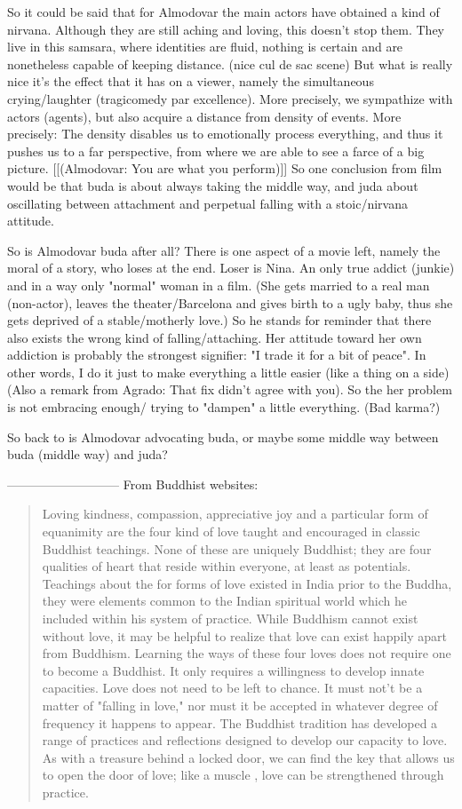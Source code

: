 \documentclass[10pt]{book}
\begin{document}
So it could be said that for Almodovar the main actors have obtained a kind of nirvana. Although they are still aching and loving, this doesn't stop them. They live in this samsara, where identities are fluid, nothing is certain and are nonetheless capable of keeping distance. (nice cul de sac scene) But what is really nice it's the effect that it has on a viewer, namely the simultaneous crying/laughter (tragicomedy par excellence). More precisely, we sympathize with actors (agents), but also acquire a distance from density of events. More precisely: The density disables us to emotionally process everything, and thus it pushes us to a far perspective, from where we are able to see a farce of a big picture.
[[(Almodovar: You are what you perform)]]
So one conclusion from film would be that buda is about always taking the middle way, and juda about oscillating between attachment and perpetual falling with a stoic/nirvana attitude.

So is Almodovar buda after all? There is one aspect of a movie left, namely the moral of a story, who loses at the end. Loser is Nina. An only true addict (junkie) and in a way only "normal" woman in a film. (She gets married to a real man (non-actor), leaves the theater/Barcelona and gives birth to a ugly baby, thus she gets deprived of a stable/motherly love.) So he stands for reminder that there also exists the wrong kind of falling/attaching. Her attitude toward her own addiction is probably the strongest signifier: "I trade it for a bit of peace". In other words, I do it just to make everything a little easier (like a thing on a side) (Also a remark from Agrado: That fix didn't agree with you). So the her problem is not embracing enough/ trying to "dampen" a little everything. (Bad karma?)

So back to is Almodovar advocating buda, or maybe some middle way between buda (middle way) and juda?  

---------------------------
From Buddhist websites:
\begin{quotation}
Loving kindness, compassion, appreciative joy and a particular form of equanimity are the four kind of love taught and encouraged in classic Buddhist teachings. None of these are uniquely Buddhist; they are four qualities of heart that reside within everyone, at least as potentials. Teachings about the for forms of love existed in India prior to the Buddha, they were elements common to the Indian spiritual world which he included within his system of practice. While Buddhism cannot exist without love, it may be helpful to realize that love can exist happily apart from Buddhism. Learning the ways of these four loves does not require one to become a Buddhist. It only requires a willingness to develop innate capacities.
Love does not need to be left to chance. It must not't be a matter of "falling in love," nor must it be accepted in whatever degree of frequency it happens to appear. The Buddhist tradition has developed a range of practices and reflections designed to develop our capacity to love. As with a treasure behind a locked door, we can find the key that allows us to open the door of love; like a muscle , love can be strengthened through practice.
\end{quotation}
\end{document}
